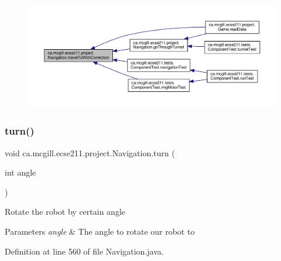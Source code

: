 \begin{figure}[H]
\begin{center}
\leavevmode
\includegraphics[width=350pt]{classca_1_1mcgill_1_1ecse211_1_1project_1_1_navigation_ae7230e905494002087416294f12cae6a_icgraph}
\end{center}
\end{figure}
\mbox{\label{classca_1_1mcgill_1_1ecse211_1_1project_1_1_navigation_ad74286ad36d333bfaf57661837457b76}} 
\subsubsection{\texorpdfstring{turn()}{turn()}}
{\footnotesize\ttfamily void ca.\+mcgill.\+ecse211.\+project.\+Navigation.\+turn (\begin{DoxyParamCaption}\item[{int}]{angle }\end{DoxyParamCaption})}

Rotate the robot by certain angle


\begin{DoxyParams}{Parameters}
{\em angle} & The angle to rotate our robot to \\
\hline
\end{DoxyParams}


Definition at line 560 of file Navigation.\+java.


